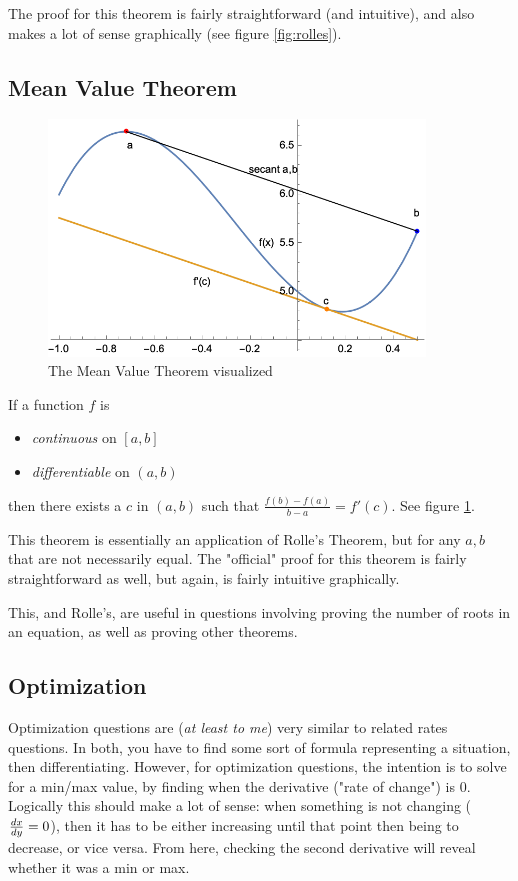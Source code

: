 \documentclass[12pt]{article}
\begin{document}
The proof for this theorem is fairly straightforward (and intuitive), and also makes a lot of sense graphically (see figure \ref{fig:rolles}).

\subsection{Mean Value Theorem}
\begin{figure}[!ht]
    \centering
    \includegraphics[width=10cm]{misc/mvt.png}
    \caption{The Mean Value Theorem visualized}
    \label{fig:mvt}
\end{figure}
\begin{shaded}
    If a function $f$ is
    \begin{itemize}
        \item \textit{continuous} on $[a,b]$
        \item \textit{differentiable} on $(a,b)$
    \end{itemize}
    then there exists a $c$ in $(a,b)$ such that $\frac{f(b)-f(a)}{b-a} = f'(c)$. See figure \ref{fig:mvt}.
\end{shaded}

This theorem is essentially an application of Rolle's Theorem, but for any $a,b$ that are not necessarily equal. The "official" proof for this theorem is fairly straightforward as well, but again, is fairly intuitive graphically.

This, and Rolle's, are useful in questions involving proving the number of roots in an equation, as well as proving other theorems.

\subsection{Optimization}
Optimization questions are (\textit{at least to me}) very similar to related rates questions. In both, you have to find some sort of formula representing a situation, then differentiating. However, for optimization questions, the intention is to solve for a min/max value, by finding when the derivative ("rate of change") is 0. Logically this should make a lot of sense: when something is not changing ($\frac{dx}{dy} = 0$), then it has to be either increasing until that point then being to decrease, or vice versa. From here, checking the second derivative will reveal whether it was a min or max. 
\end{document}
